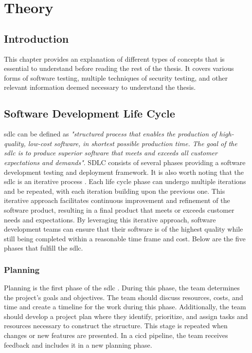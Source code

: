 \chapter{Theory}
\label{chap:Theory}

\section{Introduction}
This chapter provides an explanation of different types of concepts that is essential to understand before reading the rest of the thesis. It covers various forms of software testing, multiple techniques of security testing, and other relevant information deemed necessary to understand the thesis.

\section{Software Development Life Cycle}
\acrlong{sdlc} can be defined as \textit{"structured process that enables the production of high-quality, low-cost software, in shortest possible production time. The goal of the \acrshort{sdlc} is to produce superior software that meets and exceeds all customer expectations and demands"}\cite{sdlc1}. SDLC consists of several phases providing a software development testing and deployment framework. It is also worth noting that the \acrlong{sdlc} is an iterative process \cite{sdlcinterative}. Each life cycle phase can undergo multiple iterations and be repeated, with each iteration building upon the previous one. This iterative approach facilitates continuous improvement and refinement of the software product, resulting in a final product that meets or exceeds customer needs and expectations. By leveraging this iterative approach, software development teams can ensure that their software is of the highest quality while still being completed within a reasonable time frame and cost. Below are the five phases that fulfill the \acrshort{sdlc}. 

\subsection{Planning} 
Planning is the first phase of the \acrshort{sdlc} \cite{planningphase}. During this phase, the team determines the project's goals and objectives. The team should discuss resources, costs, and time and create a timeline for the work during this phase. Additionally, the team should develop a project plan where they identify, prioritize, and assign tasks and resources necessary to construct the structure. This stage is repeated when changes or new features are presented. In a \acrshort{cicd} pipeline, the team receives feedback and includes it in a new planning phase.

